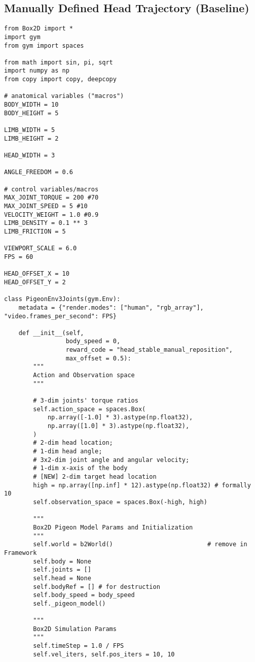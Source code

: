 \subsection{Manually Defined Head Trajectory (Baseline)}
\begin{lstlisting}
from Box2D import *
import gym
from gym import spaces

from math import sin, pi, sqrt
import numpy as np
from copy import copy, deepcopy

# anatomical variables ("macros")
BODY_WIDTH = 10
BODY_HEIGHT = 5

LIMB_WIDTH = 5
LIMB_HEIGHT = 2

HEAD_WIDTH = 3

ANGLE_FREEDOM = 0.6

# control variables/macros
MAX_JOINT_TORQUE = 200 #70
MAX_JOINT_SPEED = 5 #10
VELOCITY_WEIGHT = 1.0 #0.9
LIMB_DENSITY = 0.1 ** 3
LIMB_FRICTION = 5

VIEWPORT_SCALE = 6.0
FPS = 60

HEAD_OFFSET_X = 10
HEAD_OFFSET_Y = 2

class PigeonEnv3Joints(gym.Env):
    metadata = {"render.modes": ["human", "rgb_array"], "video.frames_per_second": FPS}

    def __init__(self,
                 body_speed = 0,
                 reward_code = "head_stable_manual_reposition",
                 max_offset = 0.5):
        """
        Action and Observation space
        """

        # 3-dim joints' torque ratios
        self.action_space = spaces.Box(
            np.array([-1.0] * 3).astype(np.float32),
            np.array([1.0] * 3).astype(np.float32),
        )
        # 2-dim head location;
        # 1-dim head angle;
        # 3x2-dim joint angle and angular velocity;
        # 1-dim x-axis of the body
        # [NEW] 2-dim target head location
        high = np.array([np.inf] * 12).astype(np.float32) # formally 10
        self.observation_space = spaces.Box(-high, high)

        """
        Box2D Pigeon Model Params and Initialization
        """
        self.world = b2World()                          # remove in Framework
        self.body = None
        self.joints = []
        self.head = None
        self.bodyRef = [] # for destruction
        self.body_speed = body_speed
        self._pigeon_model()

        """
        Box2D Simulation Params
        """
        self.timeStep = 1.0 / FPS
        self.vel_iters, self.pos_iters = 10, 10


\end{lstlisting}
